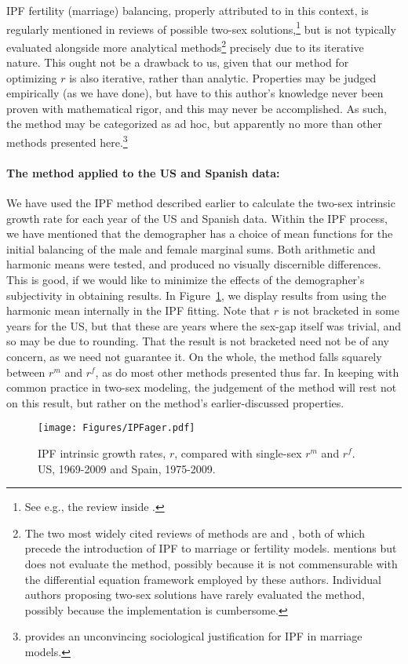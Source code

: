 IPF fertility (marriage) balancing, properly attributed to \citet{mc1975models}
in this context, is regularly mentioned in reviews of possible two-sex
solutions,\footnote{See e.g., the review inside \citet{ianelli2005gender}.} but
is not typically evaluated alongside more analytical
methods\footnote{The two most widely cited
reviews of methods are \citet{keyfitz1972mathematics} and
\citet{pollard1973mathematical}, both of which precede the introduction of IPF
to marriage or fertility models. \citet{ianelli2005gender} mentions but does not
evaluate the method, possibly because it is not commensurable with the
differential equation framework employed by these authors. Individual authors proposing
two-sex solutions have rarely evaluated the method, possibly because the implementation
is cumbersome.} precisely due to its iterative nature. This ought not be a
drawback to us, given that our method for optimizing $r$ is also iterative,
rather than analytic. Properties may be judged empirically (as we have done),
but have to this author's knowledge never been proven with mathematical rigor,
and this may never be accomplished. As such, the method may be categorized as ad
hoc, but apparently no more than other methods presented
here.\footnote{\citet{mc1975models} provides an unconvincing sociological justification for IPF in marriage
models.}

\paragraph{The method applied to the US and Spanish data:}

We have used the IPF method described earlier to calculate the two-sex intrinsic
growth rate for each year of the US and Spanish data. Within the IPF process, we
have mentioned that the demographer has a choice of mean functions for the
initial balancing of the male and female marginal sums. Both arithmetic and
harmonic means were tested, and produced no visually discernible differences.
This is good, if we would like to minimize the effects of the demographer's
subjectivity in obtaining results. In Figure~\ref{fig:IPFager}, we display
results from using the harmonic mean internally in the IPF fitting. Note that
$r$ is not bracketed in some years for the US, but that these are years where 
the sex-gap itself was trivial, and so may be due to
rounding. That the result is not bracketed need not be of any concern, as we
need not guarantee it. On the whole, the method falls squarely between $r^m$ and
$r^f$, as do most other methods presented thus far. In keeping with common
practice in two-sex modeling, the judgement of the method will rest not on this
result, but rather on the method's earlier-discussed properties.

\begin{figure}[ht!]
        \centering  
          \caption{IPF intrinsic growth rates, $r$, compared with
          single-sex $r^m$ and $r^f$. US, 1969-2009 and Spain, 1975-2009.}
           \texttt{[image: Figures/IPFager.pdf]}
          \label{fig:IPFager}
\end{figure}




\FloatBarrier

